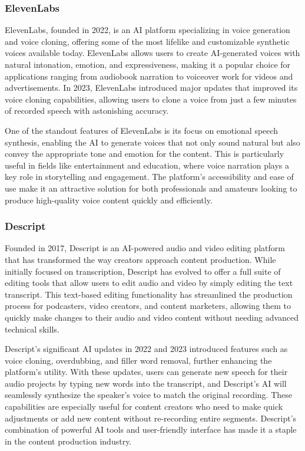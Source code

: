\subsubsection{ElevenLabs}

ElevenLabs, founded in 2022, is an AI platform specializing in voice generation and voice cloning, offering some of the most lifelike and customizable synthetic voices available today. 
ElevenLabs allows users to create AI-generated voices with natural intonation, emotion, and expressiveness, making it a popular choice for applications ranging from audiobook narration to voiceover work for videos and advertisements. 
In 2023, ElevenLabs introduced major updates that improved its voice cloning capabilities, allowing users to clone a voice from just a few minutes of recorded speech with astonishing accuracy.

One of the standout features of ElevenLabs is its focus on emotional speech synthesis, enabling the AI to generate voices that not only sound natural but also convey the appropriate tone and emotion for the content. 
This is particularly useful in fields like entertainment and education, where voice narration plays a key role in storytelling and engagement. 
The platform’s accessibility and ease of use make it an attractive solution for both professionals and amateurs looking to produce high-quality voice content quickly and efficiently.

\subsubsection{Descript}

Founded in 2017, Descript is an AI-powered audio and video editing platform that has transformed the way creators approach content production. 
While initially focused on transcription, Descript has evolved to offer a full suite of editing tools that allow users to edit audio and video by simply editing the text transcript. 
This text-based editing functionality has streamlined the production process for podcasters, video creators, and content marketers, allowing them to quickly make changes to their audio and video content without needing advanced technical skills.

Descript’s significant AI updates in 2022 and 2023 introduced features such as voice cloning, overdubbing, and filler word removal, further enhancing the platform’s utility. 
With these updates, users can generate new speech for their audio projects by typing new words into the transcript, and Descript’s AI will seamlessly synthesize the speaker’s voice to match the original recording. 
These capabilities are especially useful for content creators who need to make quick adjustments or add new content without re-recording entire segments. 
Descript’s combination of powerful AI tools and user-friendly interface has made it a staple in the content production industry.

